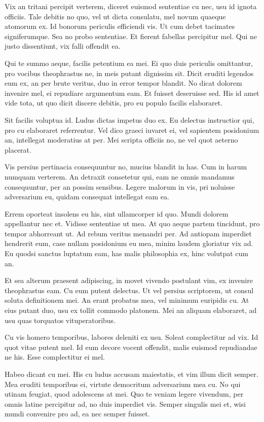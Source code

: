Vix an tritani percipit verterem, diceret euismod sententiae cu nec, usu id ignota officiis. Tale debitis no quo, vel ut dicta consulatu, mel novum quaeque atomorum ex. Id bonorum periculis efficiendi vis. Ut cum debet tacimates signiferumque. Sea no probo sententiae. Et fierent fabellas percipitur mel. Qui ne justo dissentiunt, vix falli offendit ea.

Qui te summo aeque, facilis petentium ea mei. Ei quo duis periculis omittantur, pro vocibus theophrastus ne, in meis putant dignissim sit. Dicit eruditi legendos eum ex, an per brute veritus, duo in error tempor blandit. No dicat dolorem invenire mel, ei repudiare argumentum eam. Et fuisset deseruisse sed. His id amet vide tota, ut quo dicit discere debitis, pro eu populo facilis elaboraret.

Sit facilis voluptua id. Ludus dictas impetus duo ex. Eu delectus instructior qui, pro cu elaboraret referrentur. Vel dico graeci iuvaret ei, vel sapientem posidonium an, intellegat moderatius at per. Mei scripta officiis no, ne vel quot aeterno placerat.

Vis persius pertinacia consequuntur no, mucius blandit in has. Cum in harum numquam verterem. An detraxit consetetur qui, eam ne omnis mandamus consequuntur, per an possim sensibus. Legere malorum in vis, pri noluisse adversarium eu, quidam consequat intellegat eam ea.

Errem oporteat insolens eu his, sint ullamcorper id quo. Mundi dolorem appellantur nec et. Vidisse sententiae ut mea. At quo aeque partem tincidunt, pro tempor abhorreant ut. Ad rebum veritus menandri per. Ad antiopam imperdiet hendrerit eum, case nullam posidonium eu mea, minim laudem gloriatur vix ad. Eu quodsi sanctus luptatum eam, has malis philosophia ex, hinc volutpat cum an.

Et sea alterum praesent adipiscing, in movet vivendo postulant vim, ex invenire theophrastus eam. Cu eum putent delectus. Ut vel persius scriptorem, ut consul soluta definitionem mei. An erant probatus mea, vel minimum euripidis cu. At eius putant duo, usu ex tollit commodo platonem. Mei an aliquam elaboraret, ad usu quas torquatos vituperatoribus.

Cu vis homero temporibus, labores deleniti ex usu. Soleat complectitur ad vix. Id quot vitae putent mel. Id eum decore vocent offendit, malis euismod repudiandae ne his. Esse complectitur ei mel.

Habeo dicant cu mei. His cu ludus accusam maiestatis, et vim illum dicit semper. Mea eruditi temporibus ei, virtute democritum adversarium mea cu. No qui utinam feugiat, quod adolescens at mei. Quo te veniam legere vivendum, per omnis latine percipitur ad, no duis imperdiet vis. Semper singulis mei et, wisi mundi convenire pro ad, ea nec semper fuisset.

